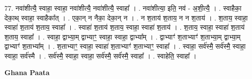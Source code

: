 \documentclass[17pt]{extarticle}
\begin{document}
77. नवा॑शीत्यै॒ स्वाहा॒ स्वाहा॒ नवा॑शीत्यै॒ नवा॑शीत्यै॒ स्वाहा᳚ । . नवा॑शीत्या॒ इति॒ नव॑ - अ॒शी॒त्यै॒ । . स्वाहैका॒ देका॒थ् स्वाहा॒ स्वाहैका᳚त् । . एका॒न् न नैका॒ देका॒न् न । . न श॒ताय॑ श॒ताय॒ न न श॒ताय॑ । . श॒ताय॒ स्वाहा॒ स्वाहा॑ श॒ताय॑ श॒ताय॒ स्वाहा᳚ । . स्वाहा॑ श॒ताय॑ श॒ताय॒ स्वाहा॒ स्वाहा॑ श॒ताय॑ । . श॒ताय॒ स्वाहा॒ स्वाहा॑ श॒ताय॑ श॒ताय॒ स्वाहा᳚ । . स्वाहा॒ द्वाभ्या॒म् द्वाभ्याꣳ॒॒ स्वाहा॒ स्वाहा॒ द्वाभ्या᳚म् । . द्वाभ्याꣳ॑ श॒ताभ्याꣳ॑ श॒ताभ्या॒म् द्वाभ्या॒म् द्वाभ्याꣳ॑ श॒ताभ्या᳚म् । . श॒ताभ्याꣳ॒॒ स्वाहा॒ स्वाहा॑ श॒ताभ्याꣳ॑ श॒ताभ्याꣳ॒॒ स्वाहा᳚ । . स्वाहा॒ सर्व॑स्मै॒ सर्व॑स्मै॒ स्वाहा॒ स्वाहा॒ सर्व॑स्मै । . सर्व॑स्मै॒ स्वाहा॒ स्वाहा॒ सर्व॑स्मै॒ सर्व॑स्मै॒ स्वाहा᳚ । . स्वाहेति॒ स्वाहा᳚ । \newline

\textbf{Ghana Paata } \newline
\end{document}
